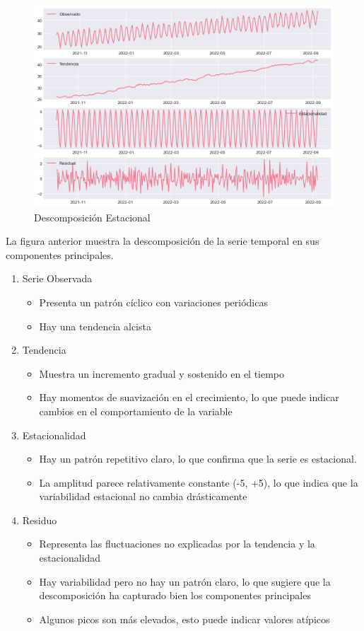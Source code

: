 \begin{figure}[h]
	\centering
	\includegraphics[width=0.7\linewidth]{seasonal_decompose_plot}
	\caption{Descomposición Estacional}
	\label{fig:seasonaldecomposeplot}
\end{figure}

La figura anterior muestra la descomposición de la serie temporal en sus componentes principales.
\begin{enumerate}
	\item	Serie Observada
	\begin{itemize}
		\item Presenta un patrón cíclico con variaciones periódicas
		\item Hay una tendencia alcista
	\end{itemize}
	\item Tendencia
	\begin{itemize}
		\item Muestra un incremento gradual y sostenido en el tiempo
		\item Hay momentos de suavización en el crecimiento, lo que puede indicar cambios en el comportamiento de la variable
	\end{itemize}
	\item Estacionalidad
	\begin{itemize}
		\item Hay un patrón repetitivo claro, lo que confirma que la serie es estacional.
		\item  La amplitud parece relativamente constante (-5, +5), lo que indica que la variabilidad estacional no cambia drásticamente
	\end{itemize}
	\item Residuo
	\begin{itemize}
		\item Representa las fluctuaciones no explicadas por la tendencia y la estacionalidad
		\item Hay variabilidad pero no hay un patrón claro, lo que sugiere que la descomposición ha capturado bien los componentes principales
		\item Algunos picos son más elevados, esto puede indicar valores atípicos
	\end{itemize}
\end{enumerate}

